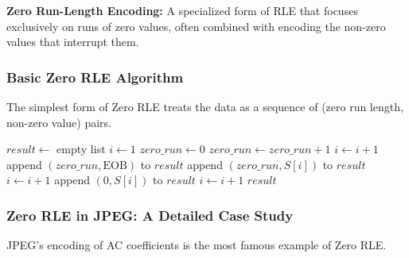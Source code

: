 \begin{definitionbox}
\textbf{Zero Run-Length Encoding:} A specialized form of RLE that focuses exclusively on runs of zero values, often combined with encoding the non-zero values that interrupt them.
\end{definitionbox}

\subsubsection{Basic Zero RLE Algorithm}

The simplest form of Zero RLE treats the data as a sequence of (zero run length, non-zero value) pairs.

\begin{algorithm}[H]
\caption{Zero RLE Encoding}
\begin{algorithmic}[1]
    \State $result \gets$ empty list
    \State $i \gets 1$
            \State $zero\_run \gets 0$
                \State $zero\_run \gets zero\_run + 1$
                \State $i \gets i + 1$
            \EndWhile
             
                \State append $(zero\_run, \text{EOB})$ to $result$
            \Else
                \State append $(zero\_run, S[i])$ to $result$
                \State $i \gets i + 1$
            \EndIf
        \Else
            \State append $(0, S[i])$ to $result$ 
            \State $i \gets i + 1$
        \EndIf
    \EndWhile
    \State \Return $result$
\EndProcedure
\end{algorithmic}
\end{algorithm}

\subsubsection{Zero RLE in JPEG: A Detailed Case Study}

JPEG's encoding of AC coefficients is the most famous example of Zero RLE.

